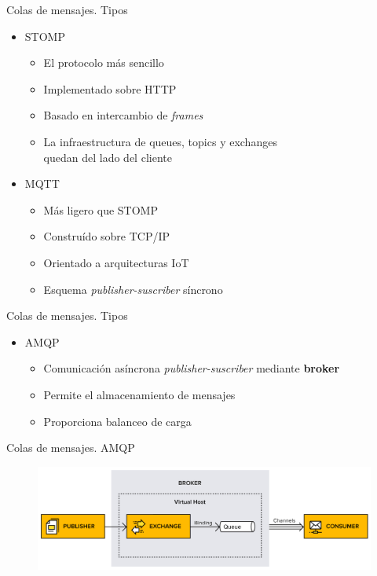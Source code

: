 \documentclass{beamer}
\begin{document}
  \begin{frame}{Colas de mensajes. Tipos}
    \begin{itemize}
      \item STOMP
      \begin{itemize}
        \item El protocolo más sencillo
        \item Implementado sobre HTTP
        \item Basado en intercambio de \textit{frames}
        \item La infraestructura de queues, topics y exchanges\\
        quedan del lado del cliente
      \end{itemize}
      \item MQTT
      \begin{itemize}
        \item Más ligero que STOMP
        \item Construído sobre TCP/IP
        \item Orientado a arquitecturas IoT
        \item Esquema \textit{publisher-suscriber} síncrono
      \end{itemize}
    \end{itemize}
  \end{frame}

  \begin{frame}{Colas de mensajes. Tipos}
    \begin{itemize}
      \item AMQP
      \begin{itemize}
        \item Comunicación asíncrona \textit{publisher-suscriber} mediante \textbf{broker}
        \item Permite el almacenamiento de mensajes
        \item Proporciona balanceo de carga
      \end{itemize}
    \end{itemize}
  \end{frame}

  \begin{frame}{Colas de mensajes. AMQP}
    \begin{figure}
      \includegraphics[width=\textwidth]{amq_concepts.png}
    \end{figure}
  \end{frame}
\end{document}
